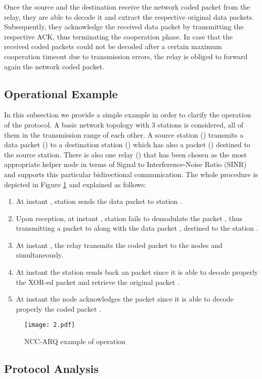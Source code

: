 \documentclass[conference]{IEEEtran}
\begin{document}
Once the source and the destination receive the network coded packet from the relay, they are able to decode it and extract the respective original data packets. Subsequently, they acknowledge the received data packet by transmitting the respective ACK, thus terminating the cooperation phase. In case that the received coded packets could not be decoded  after a certain maximum cooperation timeout due to transmission errors, the relay is obliged to forward again the network coded packet.


\subsection{Operational Example}

In this subsection we provide a simple example in order to clarify the operation of the protocol. A basic network topology with 3 stations is considered, all of them in the transmission range of each other. A source station () transmits a data packet () to a destination station () which has also a packet () destined to the source station. There is also one relay () that has been chosen as the most appropriate helper node in terms of Signal to Interference-Noise Ratio (SINR) and supports this particular bidirectional communication. The whole procedure is depicted in Figure \ref{f2} and explained as follows:
\begin{enumerate}
\item At instant , station  sends the data packet  to station .
\item Upon reception, at instant , station  fails to demodulate the packet , thus transmitting a  packet to  along with the data packet , destined to the station .
\item At instant , the relay   transmits the coded packet  to the nodes  and  simultaneously.
\item At instant   the station  sends back an  packet since it is able to decode properly the XOR-ed packet and retrieve the original packet .
\item At instant   the node  acknowledges the packet  since it is able to decode properly the coded packet .
\end{enumerate}

\begin{figure}[htb]
\centering
\texttt{[image: 2.pdf]}
\caption{NCC-ARQ example of operation}\label{f2}
\end{figure}

\subsection{Protocol Analysis}
\end{document}
